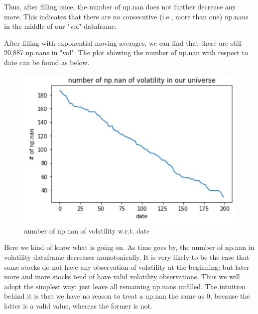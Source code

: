 \documentclass[onecolumn]{article}
\begin{document}
Thus, after filling once, the number of np.nan does not further decrease any more. This indicates that there are no consecutive (i.e., more than one) np.nans in the middle of our "vol" dataframe.

\indent After filling with exponential moving averages, we can find that there are still 20,887 np.nans in "vol". The plot showing the number of np.nan with respect to date can be found as below.
\begin{figure}[ht]
\centering
\includegraphics[scale=0.6]{num_of_nan.PNG}
\caption{number of np.nan of volatility w.r.t. date}
\label{fig:label}
\end{figure}

Here we kind of know what is going on. As time goes by, the number of np.nan in volatility dataframe decreases monotonically. It is very likely to be the case that some stocks do not have any observation of volatility at the beginning; but later more and more stocks tend of have valid volatility observations. Thus we will adopt the simplest way: just leave all remaining np.nans unfilled. The intuition behind it is that we have no reason to treat a np.nan the same as 0, because the latter is a valid value, whereas the former is not.
\end{document}
